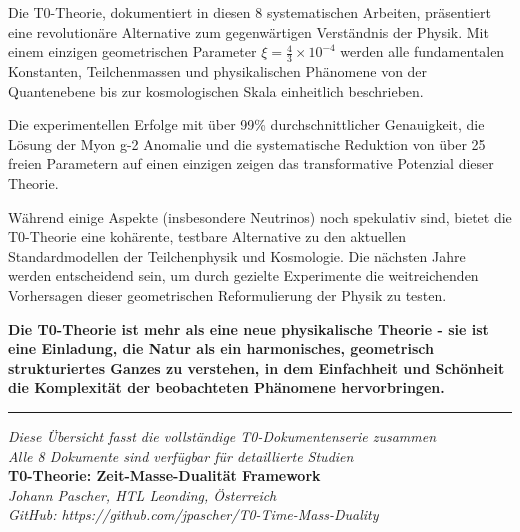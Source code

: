 \documentclass[12pt,a4paper]{article}
\newcommand{\xipar}{\xi}
\begin{document}
	Die T0-Theorie, dokumentiert in diesen 8 systematischen Arbeiten, präsentiert eine revolutionäre Alternative zum gegenwärtigen Verständnis der Physik. Mit einem einzigen geometrischen Parameter $\xipar = \frac{4}{3} \times 10^{-4}$ werden alle fundamentalen Konstanten, Teilchenmassen und physikalischen Phänomene von der Quantenebene bis zur kosmologischen Skala einheitlich beschrieben.
	
	Die experimentellen Erfolge mit über 99\% durchschnittlicher Genauigkeit, die Lösung der Myon g-2 Anomalie und die systematische Reduktion von über 25 freien Parametern auf einen einzigen zeigen das transformative Potenzial dieser Theorie.
	
	Während einige Aspekte (insbesondere Neutrinos) noch spekulativ sind, bietet die T0-Theorie eine kohärente, testbare Alternative zu den aktuellen Standardmodellen der Teilchenphysik und Kosmologie. Die nächsten Jahre werden entscheidend sein, um durch gezielte Experimente die weitreichenden Vorhersagen dieser geometrischen Reformulierung der Physik zu testen.
	
	\textbf{Die T0-Theorie ist mehr als eine neue physikalische Theorie - sie ist eine Einladung, die Natur als ein harmonisches, geometrisch strukturiertes Ganzes zu verstehen, in dem Einfachheit und Schönheit die Komplexität der beobachteten Phänomene hervorbringen.}
	
	\vfill
	
	\begin{center}
		\hrule
		\vspace{0.5cm}
		\textit{Diese Übersicht fasst die vollständige T0-Dokumentenserie zusammen}\\
		\textit{Alle 8 Dokumente sind verfügbar für detaillierte Studien}\\
		\vspace{0.3cm}
		\textbf{T0-Theorie: Zeit-Masse-Dualität Framework}\\
		\textit{Johann Pascher, HTL Leonding, Österreich}\\
		\textit{GitHub: https://github.com/jpascher/T0-Time-Mass-Duality}
		\vspace{0.3cm}
	\end{center}
	
\end{document}

